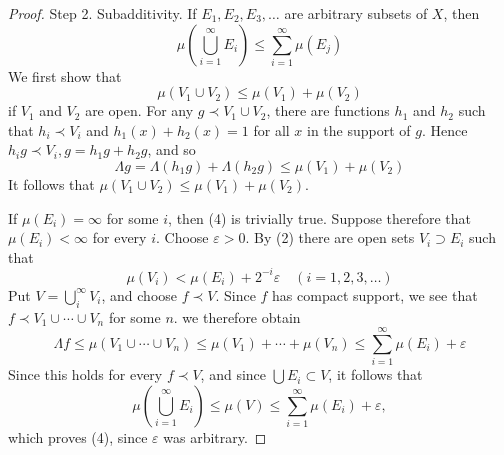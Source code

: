 \documentclass[12pt, a4paper, oneside]{book}
\begin{document}
\begin{theorem}
\begin{proof}
        Step 2. Subadditivity. If $E_1, E_2, E_3, \ldots$ are arbitrary subsets of $X$, then
        \begin{equation*}
            \mu\left(\bigcup_{i=1}^{\infty} E_i\right) \leq \sum_{i=1}^{\infty} \mu\left(E_j\right)
            \tag{4}
        \end{equation*}
        We first show that
        \begin{equation*}
            \mu\left(V_1 \cup V_2\right) \leq \mu\left(V_1\right)+\mu\left(V_2\right)
        \end{equation*}
        if $V_1$ and $V_2$ are open. For any $g\prec V_1 \cup V_2$,
        there are functions $h_1$ and $h_2$ such that $h_i\prec V_i$ and $h_1(x)+h_2(x)=1$ for all $x$ in the support of $g$. Hence $h_i g\prec V_i, g=h_1 g+h_2 g$, and so
        \begin{equation*}
            \Lambda g=\Lambda\left(h_1 g\right)+\Lambda\left(h_2 g\right) \leq \mu\left(V_1\right)+\mu\left(V_2\right)
        \end{equation*}
        It follows that $\mu\left(V_1 \cup V_2\right) \leq \mu\left(V_1\right)+\mu\left(V_2\right)$.

        If $\mu\left(E_i\right)=\infty$ for some $i$, then (4) is trivially true. Suppose therefore that $\mu\left(E_i\right)<\infty$ for every $i$.
        Choose $\varepsilon>0$. By (2) there are open sets $V_i \supset E_i$ such that
        \begin{equation*}
            \mu\left(V_i\right)<\mu\left(E_i\right)+2^{-i} \varepsilon \quad(i=1,2,3, \ldots)
        \end{equation*}
        Put $V=\bigcup_i^{\infty} V_i$, and choose $f \prec V$. Since $f$ has compact support, we see that $f \prec V_1 \cup \cdots \cup V_n$ for some $n$. we therefore obtain
        \begin{equation*}
            \Lambda f
            \leq
            \mu\left(V_1 \cup \cdots \cup V_n\right)
            \leq
            \mu\left(V_1\right)+\cdots+\mu\left(V_n\right)
            \leq \sum_{i=1}^{\infty} \mu\left(E_i\right)+\varepsilon
        \end{equation*}
        Since this holds for every $f \prec V$, and since $\bigcup E_i \subset V$, it follows that
        \begin{equation*}
            \mu\left(\bigcup_{i=1}^{\infty} E_i\right) \leq \mu(V) \leq \sum_{i=1}^{\infty} \mu\left(E_i\right)+\varepsilon,
        \end{equation*}
        which proves (4), since $\varepsilon$ was arbitrary.


\end{proof}
\end{theorem}
\end{document}
